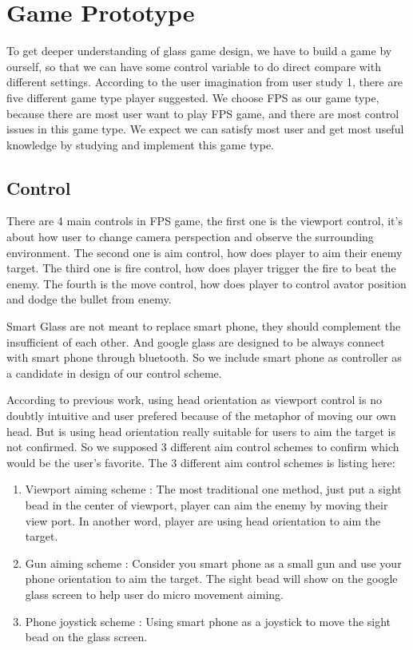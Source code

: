 \section{Game Prototype}

To get deeper understanding of glass game design, we have to build a game by ourself, so that we can have some control variable to do direct compare with different settings. According to the user imagination from user study 1, there are five different game type player suggested. We choose FPS as our game type, because there are most user want to play FPS game, and there are most control issues in this game type. We expect we can satisfy most user and get most useful knowledge by studying and implement this game type.



\subsection{Control}
There are 4 main controls in FPS game, the first one is the viewport control, it's about how user to change camera perspection and observe the surrounding environment. The second one is aim control, how does player to aim their enemy target. The third one is fire control, how does player trigger the fire to beat the enemy. The fourth is the move control, how does player to control avator position and dodge the bullet from enemy.

Smart Glass are not meant to replace smart phone\cite{lecture}, they should complement the insufficient of each other. And google glass are designed to be always connect with smart phone through bluetooth. So we include smart phone as controller as a candidate in design of our control scheme.

According to previous work\cite{headvideo,tele,robot,viewport}, using head orientation as viewport control is no doubtly intuitive and user prefered because of the metaphor of moving our own head. But is using head orientation really suitable for users to aim the target is not confirmed. So we supposed 3 different aim control schemes to confirm which would be the user's favorite. The 3 different aim control schemes is listing here:

\begin{enumerate}
\item Viewport aiming scheme : The most traditional one method, just put a sight bead in the center of viewport, player can aim the enemy by moving their view port. In another word, player are using head orientation to aim the target.

\item Gun aiming scheme : Consider you smart phone as a small gun and use your phone orientation to aim the target. The sight bead will show on the google glass screen to help user do micro movement aiming.

\item Phone joystick scheme : Using smart phone as a joystick to move the sight bead on the glass screen.
\end{enumerate}

